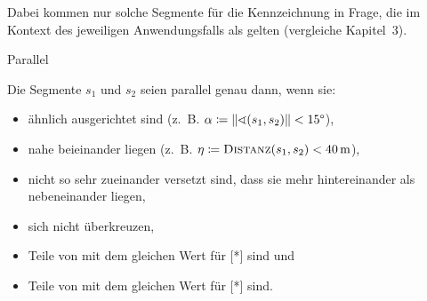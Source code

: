\documentclass[../main/thesis.tex]{subfiles}
\begin{document}


Dabei kommen nur solche Segmente für die Kennzeichnung in Frage, die im Kontext des jeweiligen Anwendungsfalls als  gelten (vergleiche Kapitel~3).

\begin{algorithmhere}{Parallel}
\label{alg:Parallel}
\begin{algorithmic}
	\State Die Segmente $s_1$ und $s_2$ seien parallel genau dann, wenn sie:
	\begin{itemize}[nosep,leftmargin=3.5em]
		\item ähnlich ausgerichtet sind (z.~B. $\alpha \eqdef \abs\sphericalangle (s_1, s_2)\abs < 15\degree$),
		\item nahe beieinander liegen (z.~B. $\eta \eqdef \textproc{Distanz}(s_1, s_2) < \unit[40]{m}$),
		\item nicht so sehr zueinander versetzt sind, dass sie mehr hintereinander als nebeneinander liegen,  %
		\item sich nicht überkreuzen,  %
		\item Teile von  mit dem gleichen Wert für [*] sind und
		\item Teile von  mit dem gleichen Wert für [*] sind.
	\end{itemize}
\EndFunction
\end{algorithmic}
\end{algorithmhere}
\end{document}
